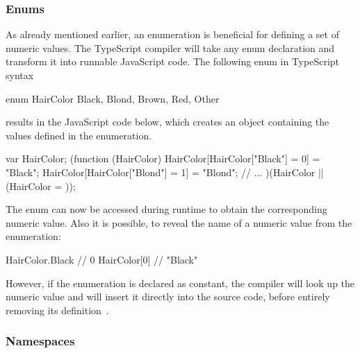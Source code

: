 \subsubsection{Enums}
\label{sec:ts-enums}

As already mentioned earlier, an enumeration is beneficial for defining a set of numeric values. The TypeScript compiler will take any enum declaration and transform it into runnable JavaScript code. The following enum in TypeScript syntax
\begin{JsCode}[numbers=none]
enum HairColor {
  Black, Blond, Brown, Red, Other
}
\end{JsCode}
results in the JavaScript code below, which creates an object containing the values defined in the enumeration.
\begin{JsCode}[numbers=none]
var HairColor;
(function (HairColor) {
    HairColor[HairColor["Black"] = 0] = "Black";
    HairColor[HairColor["Blond"] = 1] = "Blond";
    // ...
})(HairColor || (HairColor = {}));
\end{JsCode}
The enum can now be accessed during runtime to obtain the corresponding numeric value. Also it is possible, to reveal the name of a numeric value from the enumeration:
\begin{JsCode}[numbers=none]
HairColor.Black // 0
HairColor[0] // "Black"
\end{JsCode}
However, if the enumeration is declared as constant, the compiler will look up the numeric value and will insert it directly into the source code, before entirely removing its definition~\cite{TypeScriptHandbook:Enums}.

\subsubsection{Namespaces}
\label{sec:ts-namespaces}

